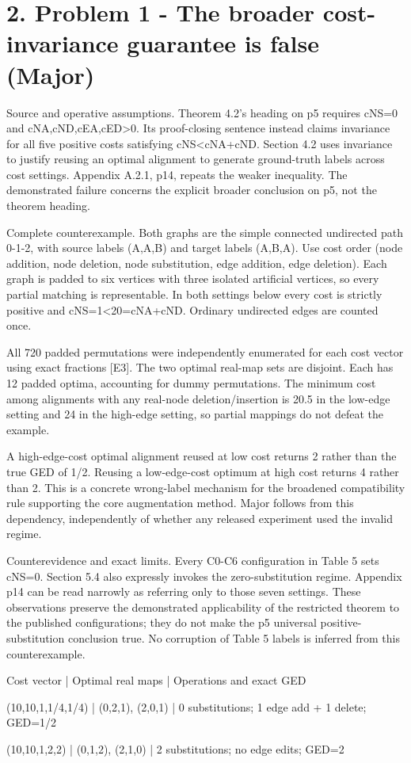 \documentclass[10pt]{article}
\begin{document}
\section*{2. Problem 1 - The broader cost-invariance guarantee is false (Major)}
Source and operative assumptions. Theorem 4.2’s heading on p5 requires cNS=0 and cNA,cND,cEA,cED>0. Its proof-closing sentence instead claims invariance for all five positive costs satisfying cNS<cNA+cND. Section 4.2 uses invariance to justify reusing an optimal alignment to generate ground-truth labels across cost settings. Appendix A.2.1, p14, repeats the weaker inequality. The demonstrated failure concerns the explicit broader conclusion on p5, not the theorem heading.\par
Complete counterexample. Both graphs are the simple connected undirected path 0-1-2, with source labels (A,A,B) and target labels (A,B,A). Use cost order (node addition, node deletion, node substitution, edge addition, edge deletion). Each graph is padded to six vertices with three isolated artificial vertices, so every partial matching is representable. In both settings below every cost is strictly positive and cNS=1<20=cNA+cND. Ordinary undirected edges are counted once.\par
All 720 padded permutations were independently enumerated for each cost vector using exact fractions [E3]. The two optimal real-map sets are disjoint. Each has 12 padded optima, accounting for dummy permutations. The minimum cost among alignments with any real-node deletion/insertion is 20.5 in the low-edge setting and 24 in the high-edge setting, so partial mappings do not defeat the example.\par
A high-edge-cost optimal alignment reused at low cost returns 2 rather than the true GED of 1/2. Reusing a low-edge-cost optimum at high cost returns 4 rather than 2. This is a concrete wrong-label mechanism for the broadened compatibility rule supporting the core augmentation method. Major follows from this dependency, independently of whether any released experiment used the invalid regime.\par
Counterevidence and exact limits. Every C0-C6 configuration in Table 5 sets cNS=0. Section 5.4 also expressly invokes the zero-substitution regime. Appendix p14 can be read narrowly as referring only to those seven settings. These observations preserve the demonstrated applicability of the restricted theorem to the published configurations; they do not make the p5 universal positive-substitution conclusion true. No corruption of Table 5 labels is inferred from this counterexample.\par
Cost vector | Optimal real maps | Operations and exact GED\par
(10,10,1,1/4,1/4) | (0,2,1), (2,0,1) | 0 substitutions; 1 edge add + 1 delete; GED=1/2\par
(10,10,1,2,2) | (0,1,2), (2,1,0) | 2 substitutions; no edge edits; GED=2\par
\end{document}
